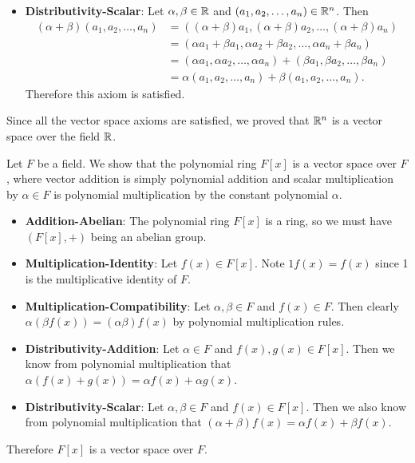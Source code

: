 \begin{example}
\begin{itemize}
        \item \textbf{Distributivity-Scalar}: Let $\alpha, \beta \in \mathbb{R}$ and $(a_1, a_2, \dots, a_n) \in \mathbb{R}^n$. Then
        \begin{align*}
            (\alpha+\beta)(a_1, a_2, \dots, a_n) &= ((\alpha+\beta)a_1, (\alpha+\beta)a_2, \dots, (\alpha+\beta)a_n)\\
            &= (\alpha a_1 + \beta a_1, \alpha a_2 + \beta a_2, \dots, \alpha a_n + \beta a_n)\\
            &= (\alpha a_1, \alpha a_2, \dots, \alpha a_n) + (\beta a_1, \beta a_2, \dots, \beta a_n)\\
            &= \alpha(a_1, a_2, \dots, a_n) + \beta(a_1, a_2, \dots, a_n).
        \end{align*}
        Therefore this axiom is satisfied.
    \end{itemize}

    Since all the vector space axioms are satisfied, we proved that $\mathbb{R}^n$ is a vector space over the field $\mathbb{R}$.
\end{example}

\begin{example}\label{example-polynomial-ring-over-field-is-vector-space}
    Let $F$ be a field. We show that the polynomial ring $F[x]$ is a vector space over $F$, where vector addition is simply polynomial addition and scalar multiplication by $\alpha \in F$ is polynomial multiplication by the constant polynomial $\alpha$.
    \begin{itemize}
        \item \textbf{Addition-Abelian}: The polynomial ring $F[x]$ is a ring, so we must have $(F[x], +)$ being an abelian group.

        \item \textbf{Multiplication-Identity}: Let $f(x) \in F[x]$. Note $1f(x) = f(x)$ since 1 is the multiplicative identity of $F$.

        \item \textbf{Multiplication-Compatibility}: Let $\alpha, \beta \in F$ and $f(x) \in F$. Then clearly $\alpha(\beta f(x)) = (\alpha\beta)f(x)$ by polynomial multiplication rules.

        \item \textbf{Distributivity-Addition}: Let $\alpha \in F$ and $f(x), g(x) \in F[x]$. Then we know from polynomial multiplication that $\alpha(f(x) + g(x)) = \alpha f(x) + \alpha g(x)$.

        \item \textbf{Distributivity-Scalar}: Let $\alpha, \beta \in F$ and $f(x) \in F[x]$. Then we also know from polynomial multiplication that $(\alpha+\beta)f(x) = \alpha f(x) + \beta f(x)$.
    \end{itemize}
    Therefore $F[x]$ is a vector space over $F$.
\end{example}

